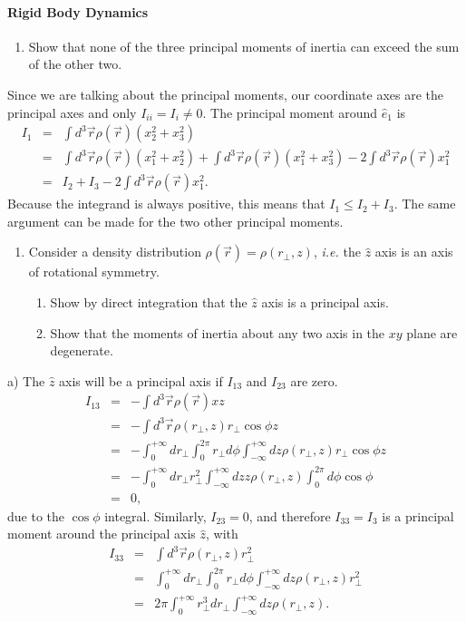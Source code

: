\documentclass[letterpaper,11pt]{article}
\begin{document}
\paragraph*{Rigid Body Dynamics}
\begin{enumerate}
 \item Show that none of the three principal moments of inertia can exceed the sum of the other two.
\end{enumerate}
Since we are talking about the principal moments, our coordinate axes are the principal axes and only $I_{ii} = I_i \ne 0$.  The principal moment around $\hat{e}_1$ is
\begin{eqnarray*}
 I_1 & = & \int d^3\vec{r} \rho(\vec{r}) (x_2^2 + x_3^2) \\
 & = & \int d^3\vec{r} \rho(\vec{r}) (x_1^2 + x_2^2) + \int d^3\vec{r} \rho(\vec{r}) (x_1^2 + x_3^2) - 2 \int d^3\vec{r} \rho(\vec{r}) x_1^2 \\
 & = & I_2 + I_3 - 2 \int d^3\vec{r} \rho(\vec{r}) x_1^2.
\end{eqnarray*}
Because the integrand is always positive, this means that $I_1 \le I_2 + I_3$.  The same argument can be made for the two other principal moments.

\begin{enumerate}[resume]
 \item Consider a density distribution $\rho(\vec{r}) = \rho(r_\perp,z)$, \textit{i.e.} the $\hat{z}$ axis is an axis of rotational symmetry.
 \begin{enumerate}
  \item Show by direct integration that the $\hat{z}$ axis is a principal axis.
  \item Show that the moments of inertia about any two axis in the $xy$ plane are degenerate.
 \end{enumerate}
\end{enumerate}
a) The $\hat{z}$ axis will be a principal axis if $I_{13}$ and $I_{23}$ are zero.
\begin{eqnarray*}
 I_{13} & = & - \int d^3\vec{r} \rho(\vec{r}) x z \\
 & = & - \int d^3\vec{r} \rho(r_\perp,z) r_\perp \cos\phi z \\
 & = & - \int_0^{+\infty} dr_\perp \int_0^{2\pi} r_\perp d\phi \int_{-\infty}^{+\infty} dz \rho(r_\perp,z) r_\perp \cos\phi z \\
 & = & - \int_0^{+\infty} dr_\perp r_\perp^2 \int_{-\infty}^{+\infty} dz z \rho(r_\perp,z) \int_0^{2\pi} d\phi \cos\phi \\
 & = & 0,
\end{eqnarray*}
due to the $\cos\phi$ integral.  Similarly, $I_{23} = 0$, and therefore $I_{33} = I_3$ is a principal moment around the principal axis $\hat{z}$, with
\begin{eqnarray*}
 I_{33} & = & \int d^3\vec{r} \rho(r_\perp,z) r_\perp^2 \\
 & = & \int_0^{+\infty} dr_\perp \int_0^{2\pi} r_\perp d\phi \int_{-\infty}^{+\infty} dz \rho(r_\perp,z) r_\perp^2 \\
 & = & 2 \pi \int_0^{+\infty} r_\perp^3 dr_\perp \int_{-\infty}^{+\infty} dz \rho(r_\perp,z).
\end{eqnarray*}
\end{document}
